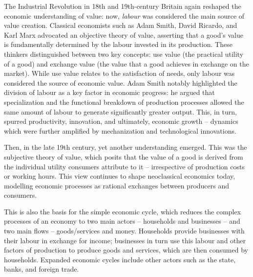 \documentclass[
  a4paper,
  DIV=11,
  numbers=noendperiod,
  oneside,
  openany]{scrreprt}
\begin{document}
The Industrial Revolution in 18th and 19th-century Britain again
reshaped the economic understanding of value: now, \emph{labour} was
considered the main source of value creation. Classical economists such
as Adam Smith, David Ricardo, and Karl Marx advocated an objective
theory of value, asserting that a good's value is fundamentally
determined by the labour invested in its production. These thinkers
distinguished between two key concepts: use value (the practical utility
of a good) and exchange value (the value that a good achieves in
exchange on the market). While use value relates to the satisfaction of
needs, only labour was considered the source of economic value. Adam
Smith notably highlighted the division of labour as a key factor in
economic progress: he argued that specialization and the functional
breakdown of production processes allowed the same amount of labour to
generate significantly greater output. This, in turn, spurred
productivity, innovation, and ultimately, economic growth -- dynamics
which were further amplified by mechanization and technological
innovations.

Then, in the late 19th century, yet another understanding emerged. This
was the subjective theory of value, which posits that the value of a
good is derived from the individual utility consumers attribute to it --
irrespective of production costs or working hours. This view continues
to shape neoclassical economics today, modelling economic processes as
rational exchanges between producers and consumers.

This is also the basis for the simple economic cycle, which reduces the
complex processes of an economy to two main actors -- households and
businesses -- and two main flows -- goods/services and money. Households
provide businesses with their labour in exchange for income; businesses
in turn use this labour and other factors of production to produce goods
and services, which are then consumed by households. Expanded economic
cycles include other actors such as the state, banks, and foreign trade.
\end{document}
